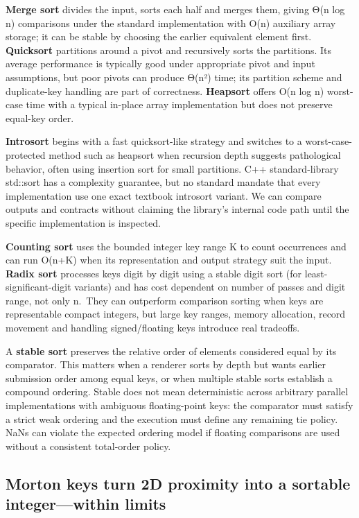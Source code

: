 \textbf{Merge sort} divides the input, sorts each half and merges them, giving Θ(n log n) comparisons under the standard implementation with O(n) auxiliary array storage; it can be stable by choosing the earlier equivalent element first. \textbf{Quicksort} partitions around a pivot and recursively sorts the partitions. Its average performance is typically good under appropriate pivot and input assumptions, but poor pivots can produce Θ(n²) time; its partition scheme and duplicate-key handling are part of correctness. \textbf{Heapsort} offers O(n log n) worst-case time with a typical in-place array implementation but does not preserve equal-key order.

\textbf{Introsort} begins with a fast quicksort-like strategy and switches to a worst-case-protected method such as heapsort when recursion depth suggests pathological behavior, often using insertion sort for small partitions. C++ standard-library std::sort has a complexity guarantee, but no standard mandate that every implementation use one exact textbook introsort variant. We can compare outputs and contracts without claiming the library's internal code path until the specific implementation is inspected.

\textbf{Counting sort} uses the bounded integer key range K to count occurrences and can run O(n+K) when its representation and output strategy suit the input. \textbf{Radix sort} processes keys digit by digit using a stable digit sort (for least-significant-digit variants) and has cost dependent on number of passes and digit range, not only n.~They can outperform comparison sorting when keys are representable compact integers, but large key ranges, memory allocation, record movement and handling signed/floating keys introduce real tradeoffs.

A \textbf{stable sort} preserves the relative order of elements considered equal by its comparator. This matters when a renderer sorts by depth but wants earlier submission order among equal keys, or when multiple stable sorts establish a compound ordering. Stable does not mean deterministic across arbitrary parallel implementations with ambiguous floating-point keys: the comparator must satisfy a strict weak ordering and the execution must define any remaining tie policy. NaNs can violate the expected ordering model if floating comparisons are used without a consistent total-order policy.

\subsection{Morton keys turn 2D proximity into a sortable integer---within limits}\label{05-engine-i-ch008-morton-keys-turn-2d-proximity-into-a-sortable-integerwithin-limits}

